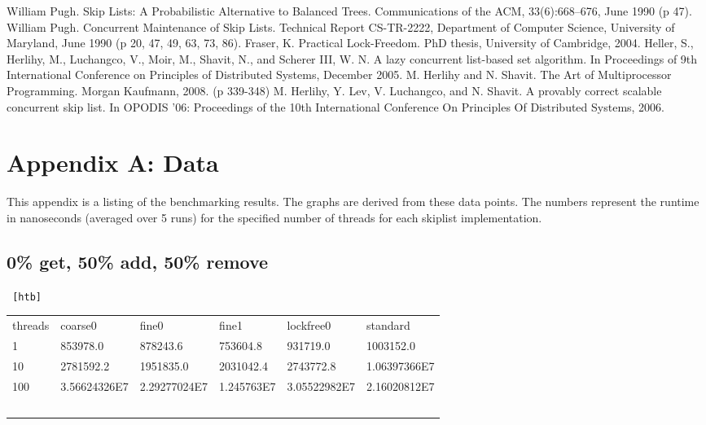\documentclass[12pt,oneline,a4paper]{ouparticle}
\makeatletter
\renewenvironment{table}%
  {\renewcommand{\familydefault}{\ttdefault}\selectfont
  \@float{table}}
  {\end@float}
\makeatother
\begin{document}
\begin{thebibliography}{0}
William Pugh. Skip Lists: A Probabilistic Alternative to Balanced Trees. Communications of the ACM, 33(6):668–676, June 1990 (p 47).
William Pugh. Concurrent Maintenance of Skip Lists. Technical Report CS-TR-2222, Department of Computer Science, University of Maryland, June 1990 (p 20, 47, 49, 63, 73, 86).
Fraser, K. Practical Lock-Freedom. PhD thesis, University of Cambridge, 2004.
Heller, S., Herlihy, M., Luchangco, V., Moir, M., Shavit, N., and Scherer III, W. N. A lazy concurrent list-based set algorithm. In Proceedings of 9th International Conference on Principles of Distributed Systems, December 2005.
M. Herlihy and N. Shavit. The Art of Multiprocessor Programming. Morgan Kaufmann, 2008. (p 339-348)
M. Herlihy, Y. Lev, V. Luchangco, and N. Shavit. A provably correct scalable concurrent skip list. In OPODIS ’06: Proceedings of the 10th International Conference On Principles Of Distributed Systems, 2006.
\end{thebibliography}














\clearpage


\section*{Appendix A: Data}

This appendix is a listing of the benchmarking results. The graphs are derived from these data points. The numbers represent the runtime in nanoseconds (averaged over 5 runs) for the specified number of threads for each skiplist implementation.

\subsection*{{0\%} get, 50\% add, 50\% remove}

{\tt
\begin{table}[htb]
    \begin{tabular}{llllll}
     threads & coarse0      & fine0        & fine1      & lockfree0    & standard     \\
    1        & 853978.0     & 878243.6     & 753604.8   & 931719.0     & 1003152.0    \\
    10       & 2781592.2    & 1951835.0    & 2031042.4  & 2743772.8    & 1.06397366E7 \\
    100      & 3.56624326E7 & 2.29277024E7 & 1.245763E7 & 3.05522982E7 & 2.16020812E7 \\
    ~        & ~            & ~            & ~          & ~            & ~            \\
    \end{tabular}
    \caption{{\rm numOps=10}}
\end{table}
}
\end{document}
